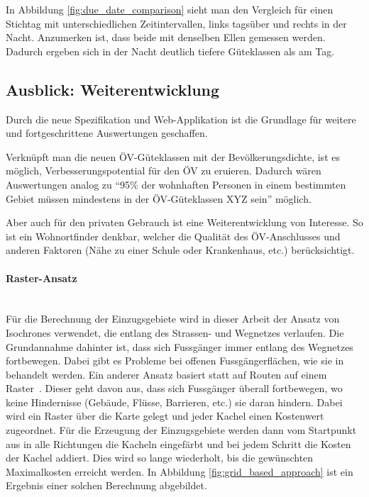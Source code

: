 In Abbildung \ref{fig:due_date_comparison} sieht man den Vergleich für einen Stichtag mit unterschiedlichen Zeitintervallen, links tagsüber und rechts in der Nacht.
Anzumerken ist, dass beide mit denselben Ellen gemessen werden.
Dadurch ergeben sich in der Nacht deutlich tiefere Güteklassen als am Tag.

\subsection{Ausblick: Weiterentwicklung}
\label{Resultate:Ausblick: Weiterentwicklung}

Durch die neue Spezifikation und Web-Applikation ist die Grundlage für weitere und fortgeschrittene Auswertungen geschaffen.

Verknüpft man die neuen \gls{ÖV-Güteklassen} mit der Bevölkerungsdichte, ist es möglich, Verbesserungspotential für den \acs{ÖV} zu eruieren.
Dadurch wären Auswertungen analog zu "`95\% der wohnhaften Personen in einem bestimmten Gebiet müssen mindestens in der \gls{ÖV-Güteklassen} XYZ sein"' möglich.

Aber auch für den privaten Gebrauch ist eine Weiterentwicklung von Interesse.
So ist ein Wohnortfinder denkbar, welcher die Qualität des \acs{ÖV}-Anschlusses und anderen Faktoren (Nähe zu einer Schule oder Krankenhaus, etc.) berücksichtigt.

\paragraph{Raster-Ansatz}~\\
Für die Berechnung der Einzugsgebiete wird in dieser Arbeit der Ansatz von \glspl{Isochrone} verwendet, die entlang des Strassen- und Wegnetzes verlaufen.
Die Grundannahme dahinter ist, dass sich Fussgänger immer entlang des Wegnetzes fortbewegen.
Dabei gibt es Probleme bei offenen Fussgängerflächen, wie sie in~\cite{plaza_route} behandelt werden.
Ein anderer Ansatz basiert statt auf Routen auf einem Raster~\cite{pedestrian_accessibility_planning}. Dieser geht davon aus, dass sich Fussgänger überall fortbewegen, wo keine Hindernisse (Gebäude, Flüsse, Barrieren, etc.) sie daran hindern.
Dabei wird ein Raster über die Karte gelegt und jeder Kachel einen Kostenwert zugeordnet.
Für die Erzeugung der Einzugsgebiete werden dann vom Startpunkt aus in alle Richtungen die Kacheln eingefärbt und bei jedem Schritt die Kosten der Kachel addiert.
Dies wird so lange wiederholt, bis die gewünschten Maximalkosten erreicht werden.
In Abbildung \ref{fig:grid_based_approach} ist ein Ergebnis einer solchen Berechnung abgebildet.

